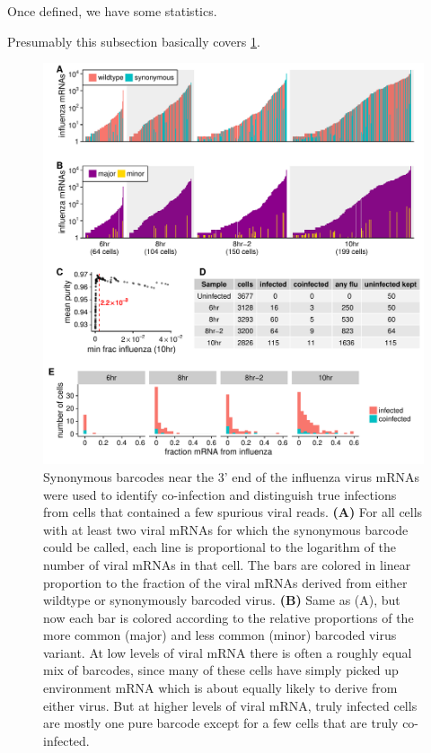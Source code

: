 \documentclass[9pt,lineno]{elife}
\begin{document}
Once defined, we have some statistics.

Presumably this subsection basically covers \ref{fig:viralbarcodes}. 

\begin{figure}
\includegraphics[width=\linewidth]{figures/p_frac_flu_summary.pdf}
\caption{\label{fig:viralbarcodes}
Synonymous barcodes near the 3' end of the influenza virus mRNAs were used to identify co-infection and distinguish true infections from cells that contained a few spurious viral reads.
{\bf (A)}
For all cells with at least two viral mRNAs for which the synonymous barcode could be called, each line is proportional to the logarithm of the number of viral mRNAs in that cell.
The bars are colored in linear proportion to the fraction of the viral mRNAs derived from either wildtype or synonymously barcoded virus.
{\bf (B)}
Same as (A), but now each bar is colored according to the relative proportions of the more common (major) and less common (minor) barcoded virus variant.
At low levels of viral mRNA there is often a roughly equal mix of barcodes, since many of these cells have simply picked up environment mRNA which is about equally likely to derive from either virus.
But at higher levels of viral mRNA, truly infected cells are mostly one pure barcode except for a few cells that are truly co-infected.
}
\end{figure}
\end{document}
